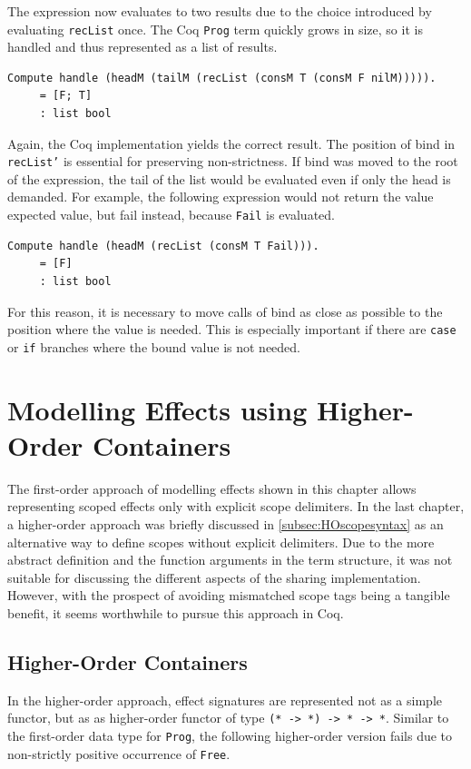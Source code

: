 \documentclass[a4paper, 11pt, fleqn, twoside]{scrreprt}
\newcommand{\hinl}[1]{\texttt{#1}}
\newcommand{\cinl}[1]{\texttt{#1}}
\begin{document}
The expression now evaluates to two results due to the choice introduced by evaluating \hinl{recList} once.
The Coq \cinl{Prog} term quickly grows in size, so it is handled and thus represented as a list of results.

\begin{verbatim}
Compute handle (headM (tailM (recList (consM T (consM F nilM))))).
     = [F; T]
     : list bool
\end{verbatim}

Again, the Coq implementation yields the correct result.
The position of bind in \cinl{recList'} is essential for preserving non-strictness.
If bind was moved to the root of the expression, the tail of the list would be evaluated even if only the head is demanded.
For example, the following expression would not return the value expected value, but fail instead, because \cinl{Fail} is evaluated.

\begin{verbatim}
Compute handle (headM (recList (consM T Fail))).
     = [F]
     : list bool
\end{verbatim}

For this reason, it is necessary to move calls of bind as close as possible to the position where the value is needed.
This is especially important if there are \cinl{case} or \cinl{if} branches where the bound value is not needed.

\section{Modelling Effects using Higher-Order Containers}
\label{sec:coqHO}

The first-order approach of modelling effects shown in this chapter allows representing scoped effects only with explicit scope delimiters.
In the last chapter, a higher-order approach was briefly discussed in \autoref{subsec:HOscopesyntax} as an alternative way to define scopes without explicit delimiters.
Due to the more abstract definition and the function arguments in the term structure, it was not suitable for discussing the different aspects of the sharing implementation.
However, with the prospect of avoiding mismatched scope tags being a tangible benefit, it seems worthwhile to pursue this approach in Coq.

\subsection{Higher-Order Containers}
In the higher-order approach, effect signatures are represented not as a simple functor, but as as higher-order functor of type \hinl{(* -> *) -> * -> *}.
Similar to the first-order data type for \hinl{Prog}, the following higher-order version fails due to non-strictly positive occurrence of \cinl{Free}.
\end{document}
